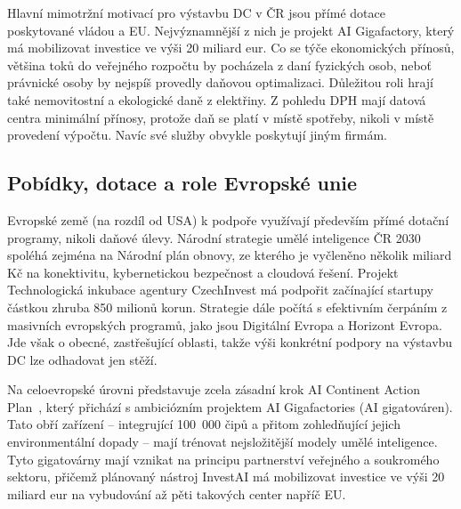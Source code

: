 
Hlavní mimotržní motivací pro výstavbu DC v ČR jsou přímé dotace poskytované vládou a EU. Nejvýznamnější z nich je projekt AI Gigafactory, který má mobilizovat investice ve výši 20 miliard eur. Co se týče ekonomických přínosů, většina toků do veřejného rozpočtu by pocházela z daní fyzických osob, neboť právnické osoby by nejspíš provedly daňovou optimalizaci. Důležitou roli hrají také nemovitostní a ekologické daně z elektřiny. Z pohledu DPH mají datová centra minimální přínosy, protože daň se platí v místě spotřeby, nikoli v místě provedení výpočtu. Navíc své služby obvykle poskytují jiným firmám.

\subsection{Pobídky, dotace a role Evropské unie}
\label{subsec:cz_legislativa_pobidky}

Evropské země (na rozdíl od USA) k podpoře využívají především přímé dotační programy, nikoli daňové úlevy. Národní strategie umělé inteligence ČR 2030~\cite{ministerstvo_prumyslu_a_obchodu_narodni_2024} spoléhá zejména na Národní plán obnovy, ze kterého je vyčleněno několik miliard Kč na konektivitu, kybernetickou bezpečnost a cloudová řešení. Projekt Technologická inkubace agentury CzechInvest má podpořit začínající startupy částkou zhruba 850 milionů korun. Strategie dále počítá s efektivním čerpáním z masivních evropských programů, jako jsou Digitální Evropa a Horizont Evropa. Jde však o obecné, zastřešující oblasti, takže výši konkrétní podpory na výstavbu DC lze odhadovat jen stěží.

Na celoevropské úrovni představuje zcela zásadní krok AI Continent Action Plan~\cite{european_commission_ai_2025}, který přichází s ambiciózním projektem AI Gigafactories (AI gigatováren). Tato obří zařízení -- integrující 100~000 čipů a přitom zohledňující jejich environmentální dopady -- mají trénovat nejsložitější modely umělé inteligence. Tyto gigatovárny mají vznikat na principu partnerství veřejného a soukromého sektoru, přičemž plánovaný nástroj InvestAI má mobilizovat investice ve výši 20 miliard eur na vybudování až pěti takových center napříč EU.

